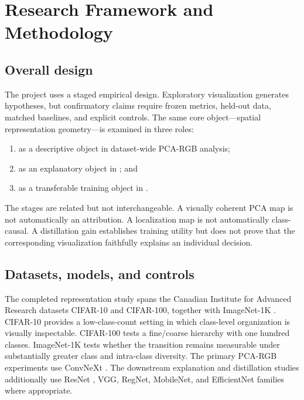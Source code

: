 \section{Research Framework and Methodology}\label{sec:framework}

\subsection{Overall design}

The project uses a staged empirical design. Exploratory visualization generates
hypotheses, but confirmatory claims require frozen metrics, held-out data,
matched baselines, and explicit controls. The same core object---spatial
representation geometry---is examined in three roles:

\begin{enumerate}[leftmargin=*]
    \item as a descriptive object in dataset-wide PCA-RGB analysis;
    \item as an explanatory object in \methodname{}; and
    \item as a transferable training object in \jmethod{}.
\end{enumerate}

The stages are related but not interchangeable. A visually coherent PCA map is
not automatically an attribution. A localization map is not automatically
class-causal. A distillation gain establishes training utility but does not
prove that the corresponding visualization faithfully explains an individual
decision.

\subsection{Datasets, models, and controls}

The completed representation study spans the Canadian Institute for Advanced
Research datasets CIFAR-10 and CIFAR-100, together with ImageNet-1K
\cite{krizhevsky2009cifar,deng2009imagenet}. CIFAR-10 provides a
low-class-count setting in which class-level organization is visually
inspectable. CIFAR-100 tests a fine/coarse hierarchy with one hundred classes.
ImageNet-1K tests whether the transition remains measurable under substantially
greater class and intra-class diversity. The primary PCA-RGB experiments use
ConvNeXt \cite{liu2022convnext}. The downstream explanation and distillation
studies additionally use ResNet \cite{he2016resnet}, VGG, RegNet, MobileNet,
and EfficientNet families where appropriate.

